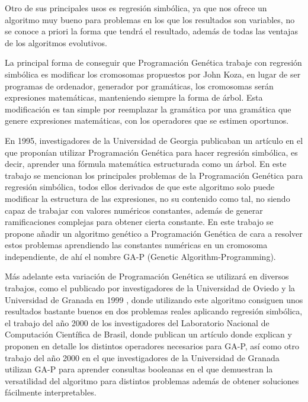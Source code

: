 Otro de sus principales usos es regresión simbólica, ya que nos ofrece un algoritmo muy bueno para problemas en los que los resultados son variables, no se conoce a priori la forma que tendrá el resultado, además de todas las ventajas de los algoritmos evolutivos.

La principal forma de conseguir que Programación Genética trabaje con regresión simbólica es modificar los cromosomas propuestos por John Koza, en lugar de ser programas de ordenador, generador por gramáticas, los cromosomas serán expresiones matemáticas, manteniendo siempre la forma de árbol. Esta modificación es tan simple por reemplazar la gramática por una gramática que genere expresiones matemáticas, con los operadores que se estimen oportunos.

En 1995, investigadores de la Universidad de Georgia publicaban un artículo \cite{primerGAP} en el que proponían utilizar Programación Genética para hacer regresión simbólica, es decir, aprender una fórmula matemática estructurada como un árbol. En este trabajo se mencionan los principales problemas de la Programación Genética para regresión simbólica, todos ellos derivados de que este algoritmo solo puede modificar la estructura de las expresiones, no su contenido como tal, no siendo capaz de trabajar con valores numéricos constantes, además de generar ramificaciones complejas para obtener cierta constante. En este trabajo se propone añadir un algoritmo genético a Programación Genética de cara a resolver estos problemas aprendiendo las constantes numéricas en un cromosoma independiente, de ahí el nombre GA-P (Genetic Algorithm-Programming).

Más adelante esta variación de Programación Genética se utilizará en diversos trabajos, como el publicado por investigadores de la Universidad de Oviedo y la Universidad de Granada en 1999 \cite{GAPredElectrica}, donde utilizando este algoritmo consiguen unos resultados bastante buenos en dos problemas reales aplicando regresión simbólica, el trabajo del año 2000 de los investigadores del Laboratorio Nacional de Computación Científica de Brasil, donde publican un artículo \cite{PGregresionSimbolica} donde explican y proponen en detalle los distintos operadores necesarios para GA-P, así como otro trabajo del año 2000 en el que investigadores de la Universidad de Granada utilizan GA-P para aprender consultas booleanas \cite{GAPFormulasBooleanas} en el que demuestran la versatilidad del algoritmo para distintos problemas además de obtener soluciones fácilmente interpretables.



\newpage
